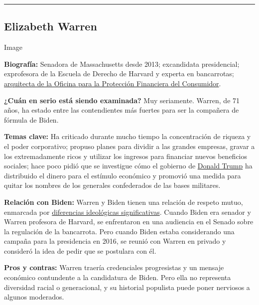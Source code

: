 \begin{center}\rule{0.5\linewidth}{\linethickness}\end{center}

\hypertarget{elizabeth-warren}{%
\subsection{Elizabeth Warren}\label{elizabeth-warren}}

Image

\textbf{Biografía:} Senadora de Massachusetts desde 2013; excandidata
presidencial; exprofesora de la Escuela de Derecho de Harvard y experta
en bancarrotas;
\href{https://www.nytimes3xbfgragh.onion/2019/09/21/us/politics/elizabeth-warren.html}{arquitecta
de la Oficina para la Protección Financiera del Consumidor}.

\textbf{¿Cuán en serio está siendo examinada?} Muy seriamente. Warren,
de 71 años, ha estado entre las contendientes más fuertes para ser la
compañera de fórmula de Biden.

\textbf{Temas clave:} Ha criticado durante mucho tiempo la concentración
de riqueza y el poder corporativo; propuso planes para dividir a las
grandes empresas, gravar a los extremadamente ricos y utilizar los
ingresos para financiar nuevos beneficios sociales; hace poco pidió que
se investigue cómo el gobierno de
\href{https://www.nytimes3xbfgragh.onion/es/interactive/2020/espanol/estados-unidos/donald-trump-elecciones.html}{Donald
Trump} ha distribuido el dinero para el estímulo económico y promovió
una medida para quitar los nombres de los generales confederados de las
bases militares.

\textbf{Relación con Biden:} Warren y Biden tienen una relación de
respeto mutuo, enmarcada por
\href{https://www.nytimes3xbfgragh.onion/2020/05/22/us/politics/democrats-biden-warren-ticket.html}{diferencias
ideológicas significativas}. Cuando Biden era senador y Warren profesora
de Harvard, se enfrentaron en una audiencia en el Senado sobre la
regulación de la bancarrota. Pero cuando Biden estaba considerando una
campaña para la presidencia en 2016, se reunió con Warren en privado y
consideró la idea de pedir que se postulara con él.

\textbf{Pros y contras:} Warren traería credenciales progresistas y un
mensaje económico contundente a la candidatura de Biden. Pero ella no
representa diversidad racial o generacional, y su historial populista
puede poner nerviosos a algunos moderados.

